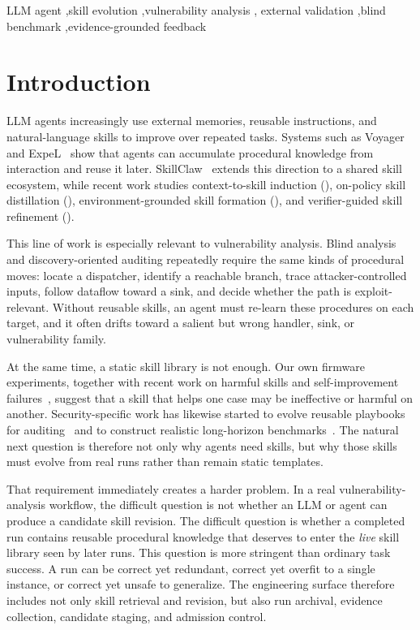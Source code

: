﻿\documentclass[preprint,12pt]{elsarticle}
\begin{document}
\begin{frontmatter}
\begin{keyword}
LLM agent \sep skill evolution \sep vulnerability analysis \sep
external validation \sep blind benchmark \sep evidence-grounded feedback
\end{keyword}

\end{frontmatter}

\section{Introduction}
\label{sec:introduction}

LLM agents increasingly use external memories, reusable instructions, and
natural-language skills to improve over repeated tasks.  Systems such as
Voyager~\cite{voyager} and ExpeL~\cite{expel} show that agents can
accumulate procedural knowledge from interaction and reuse it later.
SkillClaw~\cite{skillclaw} extends this direction to a shared skill
ecosystem, while recent work studies context-to-skill induction
(\cite{ctx2skill}), on-policy skill distillation (\cite{opid}),
environment-grounded skill formation (\cite{spark,skillevolbench}), and
verifier-guided skill refinement (\cite{trace2skill,veriskill}).

This line of work is especially relevant to vulnerability analysis.  Blind
analysis and discovery-oriented auditing repeatedly require the same kinds
of procedural moves: locate a dispatcher, identify a reachable branch,
trace attacker-controlled inputs, follow dataflow toward a sink, and decide
whether the path is exploit-relevant.  Without reusable skills, an agent
must re-learn these procedures on each target, and it often drifts toward a
salient but wrong handler, sink, or vulnerability family.

At the same time, a static skill library is not enough.  Our own firmware
experiments, together with recent work on harmful skills and
self-improvement failures~\cite{skillharmful,misevolution}, suggest that a
skill that helps one case may be ineffective or harmful on another.
Security-specific work has likewise started to evolve reusable playbooks
for auditing~\cite{evohunt} and to construct realistic long-horizon
benchmarks~\cite{secbenchpro}.  The natural next question is therefore not
only why agents need skills, but why those skills must evolve from real
runs rather than remain static templates.

That requirement immediately creates a harder problem.  In a real
vulnerability-analysis workflow, the difficult question is not whether an
LLM or agent can produce a candidate skill revision.  The difficult
question is whether a completed run contains reusable procedural knowledge
that deserves to enter the \emph{live} skill library seen by later runs.
This question is more stringent than ordinary task success.  A run can be
correct yet redundant, correct yet overfit to a single instance, or
correct yet unsafe to generalize.  The engineering surface therefore
includes not only skill retrieval and revision, but also run archival,
evidence collection, candidate staging, and admission control.
\end{document}
